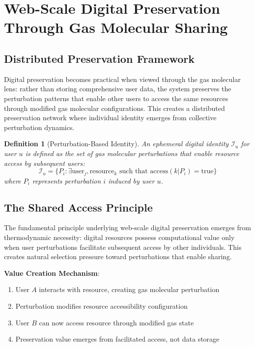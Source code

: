 \documentclass[12pt,a4paper]{article}
\newtheorem{definition}{Definition}
\begin{document}
\section{Web-Scale Digital Preservation Through Gas Molecular Sharing}

\subsection{Distributed Preservation Framework}

Digital preservation becomes practical when viewed through the gas molecular lens: rather than storing comprehensive user data, the system preserves the perturbation patterns that enable other users to access the same resources through modified gas molecular configurations. This creates a distributed preservation network where individual identity emerges from collective perturbation dynamics.

\begin{definition}[Perturbation-Based Identity]
An ephemeral digital identity $\mathcal{I}_u$ for user $u$ is defined as the set of gas molecular perturbations that enable resource access by subsequent users:
\begin{equation}
\mathcal{I}_u = \{P_i : \exists \text{user}_j, \text{resource}_k \text{ such that } \text{access}(k|P_i) = \text{true}\}
\end{equation}
where $P_i$ represents perturbation $i$ induced by user $u$.
\end{definition}

\subsection{The Shared Access Principle}

The fundamental principle underlying web-scale digital preservation emerges from thermodynamic necessity: digital resources possess computational value only when user perturbations facilitate subsequent access by other individuals. This creates natural selection pressure toward perturbations that enable sharing.

\textbf{Value Creation Mechanism}:
\begin{enumerate}
\item User $A$ interacts with resource, creating gas molecular perturbation
\item Perturbation modifies resource accessibility configuration  
\item User $B$ can now access resource through modified gas state
\item Preservation value emerges from facilitated access, not data storage
\end{enumerate}
\end{document}
